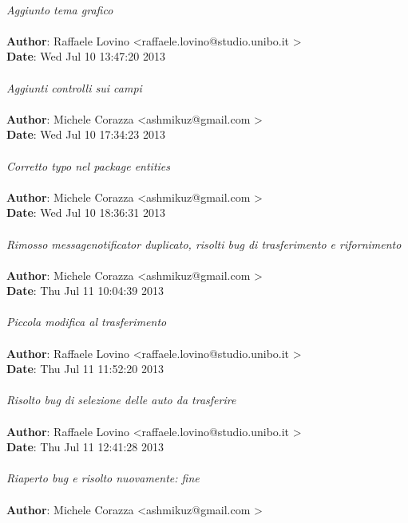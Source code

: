 \documentclass[a4paper,12pt]{article} %
\begin{document}
\\
    \emph{Aggiunto tema grafico}\\
\\
\textbf{Author}: Raffaele Lovino \textless raffaele.lovino@studio.unibo.it \textgreater \\
\textbf{Date}:   Wed Jul 10 13:47:20 2013 \\
\\
    \emph{Aggiunti controlli sui campi}\\
\\
\textbf{Author}: Michele Corazza \textless ashmikuz@gmail.com \textgreater \\
\textbf{Date}:   Wed Jul 10 17:34:23 2013 \\
\\
    \emph{Corretto typo nel package entities}\\
\\
\textbf{Author}: Michele Corazza \textless ashmikuz@gmail.com \textgreater \\
\textbf{Date}:   Wed Jul 10 18:36:31 2013 \\
\\
    \emph{Rimosso messagenotificator duplicato, risolti bug di trasferimento e rifornimento}\\
\\
\textbf{Author}: Michele Corazza \textless ashmikuz@gmail.com \textgreater \\
\textbf{Date}:   Thu Jul 11 10:04:39 2013 \\
\\
    \emph{Piccola modifica al trasferimento}\\
\\
\textbf{Author}: Raffaele Lovino \textless raffaele.lovino@studio.unibo.it \textgreater \\
\textbf{Date}:   Thu Jul 11 11:52:20 2013 \\
\\
    \emph{Risolto bug di selezione delle auto da trasferire}\\
\\
\textbf{Author}: Raffaele Lovino \textless raffaele.lovino@studio.unibo.it \textgreater \\
\textbf{Date}:   Thu Jul 11 12:41:28 2013 \\
\\
    \emph{Riaperto bug e risolto nuovamente: fine}\\
\\
\textbf{Author}: Michele Corazza \textless ashmikuz@gmail.com \textgreater \\
\end{document}
